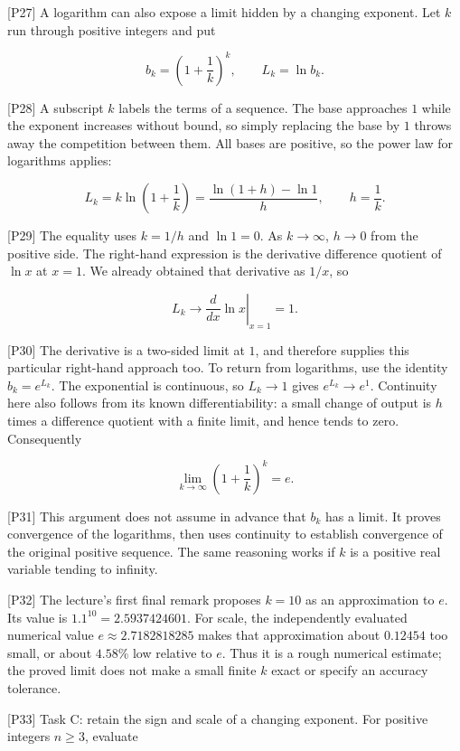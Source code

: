\documentclass[
  11pt,
]{article}
\begin{document}
{[}P27{]} A logarithm can also expose a limit hidden by a changing
exponent. Let \(k\) run through positive integers and put

\[
b_k=\left(1+\frac1k\right)^k,\qquad L_k=\ln b_k.
\]

{[}P28{]} A subscript \(k\) labels the terms of a sequence. The base
approaches \(1\) while the exponent increases without bound, so simply
replacing the base by \(1\) throws away the competition between them.
All bases are positive, so the power law for logarithms applies:

\[
L_k=k\ln\left(1+\frac1k\right)
=\frac{\ln(1+h)-\ln1}{h},\qquad h=\frac1k.
\]

{[}P29{]} The equality uses \(k=1/h\) and \(\ln1=0\). As \(k\to\infty\),
\(h\to0\) from the positive side. The right-hand expression is the
derivative difference quotient of \(\ln x\) at \(x=1\). We already
obtained that derivative as \(1/x\), so

\[
L_k\longrightarrow \left.\frac{d}{dx}\ln x\right|_{x=1}=1.
\]

{[}P30{]} The derivative is a two-sided limit at \(1\), and therefore
supplies this particular right-hand approach too. To return from
logarithms, use the identity \(b_k=e^{L_k}\). The exponential is
continuous, so \(L_k\to1\) gives \(e^{L_k}\to e^1\). Continuity here
also follows from its known differentiability: a small change of output
is \(h\) times a difference quotient with a finite limit, and hence
tends to zero. Consequently

\[
\lim_{k\to\infty}\left(1+\frac1k\right)^k=e.
\]

{[}P31{]} This argument does not assume in advance that \(b_k\) has a
limit. It proves convergence of the logarithms, then uses continuity to
establish convergence of the original positive sequence. The same
reasoning works if \(k\) is a positive real variable tending to
infinity.

{[}P32{]} The lecture's first final remark proposes \(k=10\) as an
approximation to \(e\). Its value is \(1.1^{10}=2.5937424601\). For
scale, the independently evaluated numerical value
\(e\approx2.7182818285\) makes that approximation about \(0.12454\) too
small, or about \(4.58\%\) low relative to \(e\). Thus it is a rough
numerical estimate; the proved limit does not make a small finite \(k\)
exact or specify an accuracy tolerance.

{[}P33{]} Task C: retain the sign and scale of a changing exponent. For
positive integers \(n\ge3\), evaluate
\end{document}
